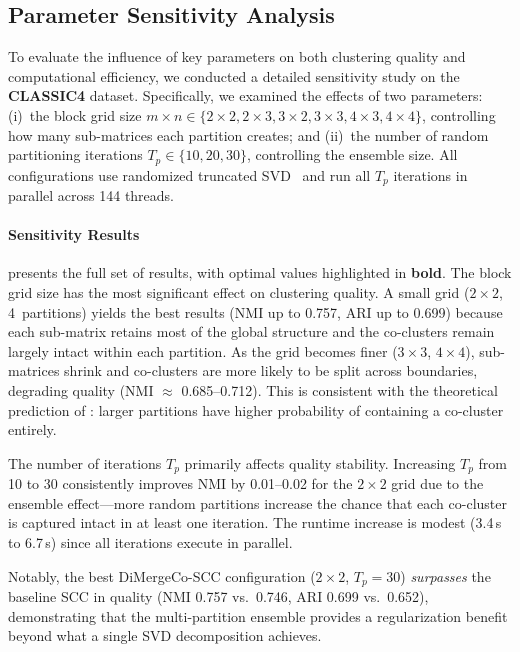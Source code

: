 \documentclass[journal]{IEEEtran}
\theoremstyle{definition}
\theoremstyle{remark} %
\renewcommand{\cite}[1]{~\autocite{#1}}
\begin{document}
{\color{blue}
\subsection{Parameter Sensitivity Analysis}
\label{subsec:param-sensitivity}

To evaluate the influence of key parameters on both clustering quality and computational efficiency, we conducted a detailed sensitivity study on the \textbf{CLASSIC4} dataset. Specifically, we examined the effects of two parameters: (i)~the block grid size $m \times n \in \{2{\times}2, 2{\times}3, 3{\times}2, 3{\times}3, 4{\times}3, 4{\times}4\}$, controlling how many sub-matrices each partition creates; and (ii)~the number of random partitioning iterations $T_p \in \{10, 20, 30\}$, controlling the ensemble size. All configurations use randomized truncated SVD\cite{halko2011FindingStructureRandomness} and run all $T_p$ iterations in parallel across 144 threads.

\paragraph{Sensitivity Results}
 presents the full set of results, with optimal values highlighted in \textbf{bold}. The block grid size has the most significant effect on clustering quality. A small grid ($2\times2$, 4~partitions) yields the best results (NMI up to 0.757, ARI up to 0.699) because each sub-matrix retains most of the global structure and the co-clusters remain largely intact within each partition. As the grid becomes finer ($3\times3$, $4\times4$), sub-matrices shrink and co-clusters are more likely to be split across boundaries, degrading quality (NMI $\approx$ 0.685--0.712). This is consistent with the theoretical prediction of : larger partitions have higher probability of containing a co-cluster entirely.

The number of iterations $T_p$ primarily affects quality stability. Increasing $T_p$ from 10 to 30 consistently improves NMI by 0.01--0.02 for the $2\times2$ grid due to the ensemble effect---more random partitions increase the chance that each co-cluster is captured intact in at least one iteration. The runtime increase is modest (3.4\,s to 6.7\,s) since all iterations execute in parallel.

Notably, the best DiMergeCo-SCC configuration ($2\times2$, $T_p=30$) \emph{surpasses} the baseline SCC in quality (NMI 0.757 vs.\ 0.746, ARI 0.699 vs.\ 0.652), demonstrating that the multi-partition ensemble provides a regularization benefit beyond what a single SVD decomposition achieves.

}
\end{document}
